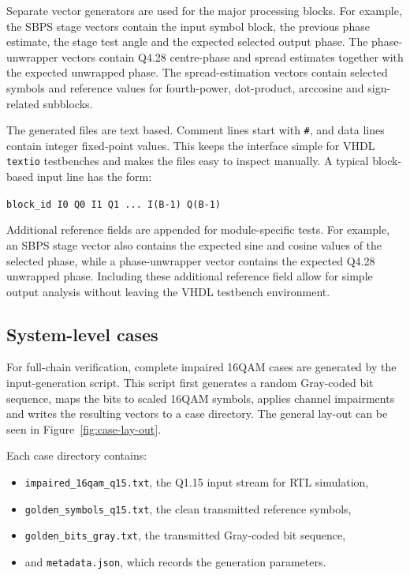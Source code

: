 Separate vector generators are used for the major processing blocks. For example, the \ac{SBPS} stage vectors contain the input symbol block, the previous phase estimate, the stage test angle and the expected selected output phase. The phase-unwrapper vectors contain Q4.28 centre-phase and spread estimates together with the expected unwrapped phase. The spread-estimation vectors contain selected symbols and reference values for fourth-power, dot-product, arccosine and sign-related subblocks.

The generated files are text based. Comment lines start with \texttt{\#}, and data lines contain integer fixed-point values. This keeps the interface simple for \ac{VHDL} \texttt{textio} testbenches and makes the files easy to inspect manually. A typical block-based input line has the form:

\begin{center}
\texttt{block\_id I0 Q0 I1 Q1 ... I(B-1) Q(B-1)}
\end{center}

Additional reference fields are appended for module-specific tests. For example, an \ac{SBPS} stage vector also contains the expected sine and cosine values of the selected phase, while a phase-unwrapper vector contains the expected Q4.28 unwrapped phase. Including these additional reference field allow for simple output analysis without leaving the VHDL testbench environment.

\subsection{System-level cases}

For full-chain verification, complete impaired \ac{16QAM} cases are generated by the input-generation script. This script first generates a random Gray-coded bit sequence, maps the bits to scaled \ac{16QAM} symbols, applies channel impairments and writes the resulting vectors to a case directory. The general lay-out can be seen in Figure~\ref{fig:case-lay-out}.

Each case directory contains:
\begin{itemize}
    \item \texttt{impaired\_16qam\_q15.txt}, the Q1.15 input stream for RTL simulation,
    \item \texttt{golden\_symbols\_q15.txt}, the clean transmitted reference symbols,
    \item \texttt{golden\_bits\_gray.txt}, the transmitted Gray-coded bit sequence,
    \item and \texttt{metadata.json}, which records the generation parameters.
\end{itemize}

